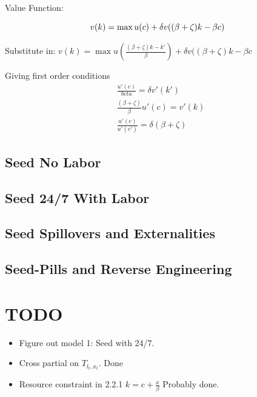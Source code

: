\documentclass[11pt]{article}
\begin{document}
  Value Function:

  \begin{equation}
    v(k) = \max u(c) + \delta v((\beta + \zeta)k - \beta c)\\
  \end{equation}
  
  Substitute in:
    $v(k) = \max u(\frac{(\beta + \zeta)k - k'}{\beta}) + \delta v((\beta + \zeta)k - \beta c$
    
  Giving first order conditions
  \begin{align}
    &\frac{u'(c)}{beta} = \delta v'(k')\\
    &\frac{(\beta + \zeta)}{\beta} u'(c) = v'(k)\\
    &\frac{u'(c)}{u'(c')} = \delta(\beta + \zeta)
  \end{align}

\subsection{Seed No Labor}
\label{sub:seed_no_labor}

\subsection{Seed 24/7 With Labor}
\label{sub:seed_24_7_with_labor}

\subsection{Seed Spillovers and Externalities}
\label{sub:seed_spillovers_and_externalities}

\subsection{Seed-Pills and Reverse Engineering}
\label{sub:seed_pills_and_reverse_engineering}

\section{TODO}
\label{sec:todo}

  \begin{itemize}
    \item Figure out model 1: Seed with 24/7.
    \item Cross partial on $T_{l_t,x_t}$. Done
    \item Resource constraint in 2.2.1 $k = c + \frac{x}{\beta}$ Probably done.
  \end{itemize}
  


\label{bib:bibliography}
\end{document}

